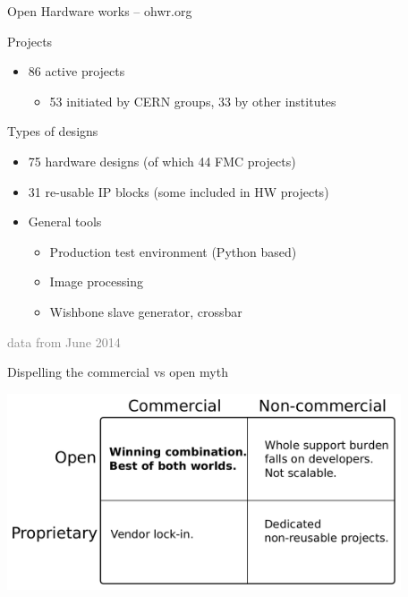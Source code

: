 \documentclass[compress,red]{beamer}
\begin{document}
\begin{frame}{Open Hardware works -- ohwr.org}
	\begin{block}{Projects}
   \begin{itemize}
	\item 86 active projects
	\begin{itemize}
		\item 53 initiated by CERN groups, 33 by other institutes
	   \end{itemize}
   \end{itemize}
	\end{block}

\begin{block}{Types of designs}
\begin{itemize}
	\item 75 hardware designs (of which 44 FMC projects)
	\item 31 re-usable IP blocks (some included in HW projects)
	\item General tools
	\begin{itemize}
		\item Production test environment (Python based)
		\item Image processing
		\item Wishbone slave generator, crossbar
	\end{itemize}
   \end{itemize}
	\end{block}
\textcolor{gray}{data from June 2014}
\end{frame}




\begin{frame}{Dispelling the commercial vs open myth}
 \begin{center}
   \includegraphics[height=5.8cm]{ohwr/commercial_and_open.pdf}
 \end{center} 
\end{frame}
\end{document}
